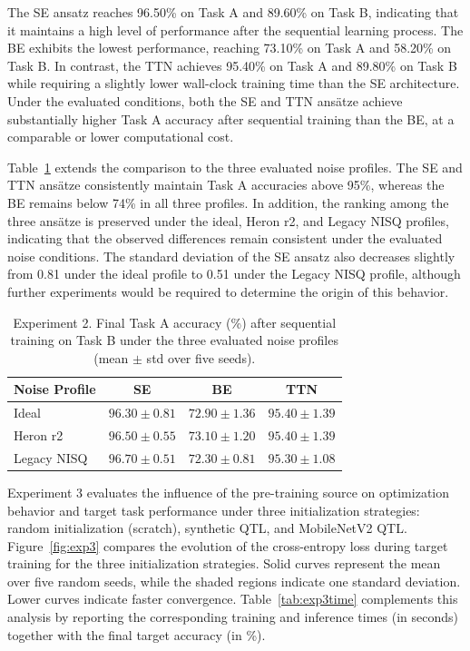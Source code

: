 \documentclass[conference]{IEEEtran}
\begin{document}
The SE ansatz reaches 96.50\% on Task A and 89.60\% on Task B, indicating that it maintains a high level of performance after the sequential learning process. The BE exhibits the lowest performance, reaching 73.10\% on Task A and 58.20\% on Task B. In contrast, the TTN achieves 95.40\% on Task A and 89.80\% on Task B while requiring a slightly lower wall-clock training time than the SE architecture. Under the evaluated conditions, both the SE and TTN ans\"atze achieve substantially higher Task A accuracy after sequential training than the BE, at a comparable or lower computational cost.

Table~\ref{tab:exp2acc} extends the comparison to the three evaluated noise profiles. The SE and TTN ans\"atze consistently maintain Task A accuracies above 95\%, whereas the BE remains below 74\% in all three profiles. In addition, the ranking among the three ans\"atze is preserved under the ideal, Heron r2, and Legacy NISQ profiles, indicating that the observed differences remain consistent under the evaluated noise conditions. The standard deviation of the SE ansatz also decreases slightly from 0.81 under the ideal profile to 0.51 under the Legacy NISQ profile, although further experiments would be required to determine the origin of this behavior.

\begin{table}[ht]
\caption{Experiment 2. Final Task A accuracy (\%) after sequential training on Task B under the three evaluated noise profiles (mean $\pm$ std over five seeds).}
\label{tab:exp2acc}
\centering
\begin{tabular}{lccc}
\toprule
Noise Profile & SE & BE & TTN \\
\midrule
Ideal & $96.30 \pm 0.81$ & $72.90 \pm 1.36$ & $95.40 \pm 1.39$ \\
Heron r2 & $96.50 \pm 0.55$ & $73.10 \pm 1.20$ & $95.40 \pm 1.39$ \\
Legacy NISQ & $96.70 \pm 0.51$ & $72.30 \pm 0.81$ & $95.30 \pm 1.08$ \\
\bottomrule
\end{tabular}
\end{table}

Experiment 3 evaluates the influence of the pre-training source on optimization behavior and target task performance under three initialization strategies: random initialization (scratch), synthetic QTL, and MobileNetV2 QTL. Figure~\ref{fig:exp3} compares the evolution of the cross-entropy loss during target training for the three initialization strategies. Solid curves represent the mean over five random seeds, while the shaded regions indicate one standard deviation. Lower curves indicate faster convergence. Table~\ref{tab:exp3time} complements this analysis by reporting the corresponding training and inference times (in seconds) together with the final target accuracy (in \%).
\end{document}
